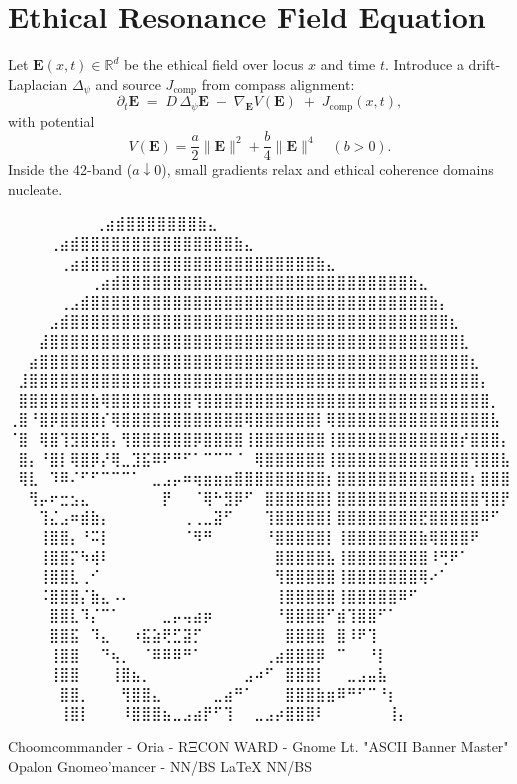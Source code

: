 
\section*{Ethical Resonance Field Equation}

Let $\mathbf{E}(x,t)\in\mathbb{R}^d$ be the ethical field over locus $x$ and time $t$.  
Introduce a drift-Laplacian $\Delta_\psi$ and source $J_{\text{comp}}$ from compass alignment:
\[
\partial_t \mathbf{E}\;=\; D\,\Delta_\psi \mathbf{E}\;-\;\nabla_{\mathbf{E}}V(\mathbf{E})\;+\;J_{\text{comp}}(x,t),
\]
with potential
\[
V(\mathbf{E})=\frac{a}{2}\lVert\mathbf{E}\rVert^2+\frac{b}{4}\lVert\mathbf{E}\rVert^4
\quad (b>0).
\]
Inside the 42-band ($a\!\downarrow\!0$), small gradients relax and ethical coherence domains nucleate.

\iffalse
⠀⠀⠀⠀⠀⠀             ⠀⠀⢀⣴⣾⣿⣿⣿⣿⣿⣿⣿⣷⣄⠀⠀⠀⠀⠀⠀⠀⠀
⠀⠀⠀  ⠀      ⠀⠀⠀⠀⢀⣴⣾⣿⣿⣿⣿⣿⣿⣿⣿⣿⣿⣿⣿⣿⣿⣿⣷⣄⠀⠀⠀⠀⠀⠀⠀⠀
⠀⠀ ⠀   ⠀⠀⠀⠀⠀⢀⣴⣾⣿⣿⣿⣿⣿⣿⣿⣿⣿⣿⣿⣿⣿⣿⣿⣿⣿⣿⣿⣿⣿⣿⣷⣄⠀⠀⠀⠀⠀⠀⠀⠀
⠀⠀⠀⠀⠀⠀⠀⠀⢀⣴⣾⣿⣿⣿⣿⣿⣿⣿⣿⣿⣿⣿⣿⣿⣿⣿⣿⣿⣿⣿⣿⣿⣿⣿⣿⣿⣿⣿⣿⣷⣄⠀⠀⠀⠀⠀⠀⠀⠀
⠀⠀⠀⠀⠀⢀⣠⣾⣿⣿⣿⣿⣿⣿⣿⣿⣿⣿⣿⣿⣿⣿⣿⣿⣿⣿⣿⣿⣿⣿⣿⣿⣿⣿⣿⣿⣿⣿⣿⣿⣿⣷⡄⠀⠀⠀⠀⠀⠀
⠀⠀⠀⠀⣠⣾⣿⣿⣿⣿⣿⣿⣿⣿⣿⣿⣿⣿⣿⣿⣿⣿⣿⣿⣿⣿⣿⣿⣿⣿⣿⣿⣿⣿⣿⣿⣿⣿⣿⣿⣿⣿⣿⣆⠀⠀⠀⠀⠀
⠀⠀⠀⣼⣿⣿⣿⣿⣿⣿⣿⣿⣿⣿⣿⣿⣿⣿⣿⣿⣿⣿⣿⣿⣿⣿⣿⣿⣿⣿⣿⣿⣿⣿⣿⣿⣿⣿⣿⣿⣿⣿⣿⣿⣇⠀⠀⠀⠀
⠀⠀⣴⣿⣿⣿⣿⣿⣿⣿⣿⣿⣿⣿⣿⣿⣿⣿⣿⣿⣿⣿⣿⣿⣿⣿⣿⣿⣿⣿⣿⣿⣿⣿⣿⣿⣿⣿⣿⣿⣿⣿⣿⣿⣿⣆⠀⠀⠀
⠀⣸⣿⣿⣿⣿⣿⣿⣿⣿⣿⣿⣿⣿⣿⣿⣿⣿⣿⣿⣿⣿⣿⣿⣿⣿⣿⣿⣿⣿⣿⣿⣿⣿⣿⣿⣿⣿⣿⣿⣿⣿⣿⣿⣿⣿⡄⠀⠀
⠀⣿⣿⣿⣿⣿⣿⣿⣷⢿⣿⣿⣿⣿⣿⣿⣿⣿⢻⣿⣿⣿⣿⣿⣿⣿⣿⣿⣿⣿⣿⣿⣿⣿⣿⣿⣿⣿⣿⣿⣿⣿⣿⣿⣿⣿⣿⡀⠀
⢀⣿⠘⣿⡿⣿⣿⣿⣿⡎⢿⣿⣿⣿⣿⣿⣿⣿⣿⣿⣿⣿⣿⢿⣿⣿⣿⣿⣿⣿⡇⢿⣿⣿⣿⣿⣿⣿⣿⣿⣿⣿⣿⣿⣿⣿⣿⣧⠀
⠈⣿⠀⢿⣿⢹⣻⣿⣯⣿⡄⢻⣿⣿⣿⣿⣿⣿⡿⣿⣿⣿⣿⢸⣿⣿⣿⣿⣿⣿⣿⢸⣿⣿⣿⣿⣿⣿⣿⣿⣿⣿⣿⣿⡞⣿⣿⣿⡄
⠀⣿⡄⠘⣿⡇⢿⣿⡿⡜⢿⣀⣹⣯⠿⠟⠛⠋⠁⠉⠉⠉⠈⠀⢿⣿⣿⣿⣿⣿⣿⢸⣿⣿⣿⣿⣿⣿⣿⣿⣿⣿⣿⣿⣿⢻⣿⣿⣧
⠀⢿⣇⠀⠹⠿⠌⠋⠋⠉⠉⠉⠁⠀⣀⣠⡤⠶⢶⣶⣶⣶⣿⣿⣿⣿⣿⣿⣿⣿⣿⡆⣿⣿⣿⣿⣿⣿⣿⣿⣿⣿⣿⣿⣿⡆⣿⣿⣿
⠀⠀⢻⡤⠖⣒⣢⣄⠀⠀⠀⠀⠀⠀⠀⡟⠀⠀⠈⢿⠓⣻⡿⠋⠀⣿⣿⣿⣿⣿⣿⡇⣿⣿⣿⣿⣿⣿⣿⣿⣿⣿⣿⣿⣿⣿⢻⣿⡟
⠀⠀⠀⢹⣌⣠⠶⣾⣷⡄⠀⠀⠀⠀⠀⠀⠀⢀⢀⣀⣽⠋⠀⠀⠀⢹⣿⣿⣿⣿⣿⡇⣿⣿⣿⣿⣿⣿⣿⣿⣟⣿⣿⣿⣿⣿⠿⠋⠀
⠀⠀⠀⢸⣿⣿⡄⠘⠭⡇⠀⠀⠀⠀⠀⠀⠀⠈⠻⠛⠀⠀⠀⠀⠀⠘⣿⣿⣿⣿⣿⡇⢸⣿⣿⣿⣿⣿⣿⣿⣷⢿⣿⣿⣿⠟⠀⠀⠀
⠀⠀⠀⢸⣿⣿⡍⠳⢾⠇⠀⠀⠀⠀⠀⠀⠀⠀⠀⠀⠀⠀⠀⠀⠀⠀⣿⣿⣿⣿⣿⣧⢸⣿⣿⣿⣿⣿⣿⣿⣿⠸⢛⠟⠁⠀⠀⠀⠀
⠀⠀⠀⢸⣿⣿⣇⢀⠊⠀⠀⠀⠀⠀⠀⠀⠀⠀⠀⠀⠀⠀⠀⠀⠀⠀⢻⣿⣿⣿⣿⣿⢸⣿⣿⣿⣿⣿⣿⣿⢿⠔⠁⠀⠀⠀⠀⠀⠀
⠀⠀⠀⠨⣿⣿⣿⡌⣷⣄⠠⠄⠀⠀⠀⠀⠀⠀⠀⠀⠀⠀⠀⠀⠀⠀⢸⣿⣿⣿⣿⣿⢸⣿⣿⣿⣿⣿⠿⠋⠀⠀⠀⠀⠀⠀⠀⠀⠀
⠀⠀⠀⠀⣿⣿⣇⠹⡌⠉⠁⠀⠀⠀⠀⣀⡤⢤⣴⡶⠀⠀⠀⠀⠀⠀⠘⣿⣿⣿⣿⠋⣾⢹⣿⣿⠋⠁⠀⠀⠀⠀⠀⠀⠀⠀⠀⠀⠀
⠀⠀⠀⠀⣿⣿⣯⠀⠹⣄⠀⠀⠰⣯⣵⢟⣋⣽⡋⠀⠀⠀⠀⠀⠀⠀⠀⣿⣿⣿⣿⠀⣿⠸⠟⢹⠀⠀⠀⠀⠀⠀⠀⠀⠀⠀⠀⠀⠀
⠀⠀⠀⠀⢸⣿⣿⠀⠀⠙⢦⡀⠀⠈⠿⠿⠿⠛⠁⠀⠀⠀⠀⠀⠀⢀⣴⣿⣿⣿⡿⠀⠉⠀⠀⠘⡇⠀⠀⠀⠀⠀⠀⠀⠀⠀⠀⠀⠀
⠀⠀⠀⠀⢸⣿⣿⠀⠀⠀⢸⣿⣦⡀⠀⠀⠀⠀⠀⠀⠀⠀⠀⣠⠴⠋⠀⣿⣿⣿⡇⠀⠀⣀⣠⣤⣧⠀⠀⠀⠀⠀⠀⠀⠀⠀⠀⠀⠀
⠀⠀⠀⠀⠀⣿⣿⡀⠀⠀⠀⢻⣿⣿⣄⠀⠀⠀⠀⠀⣀⣴⠛⠁⠀⠀⠀⣿⣿⣿⣷⣶⠿⠛⠋⠉⠘⡆⠀⠀⠀⠀⠀⠀⠀⠀⠀⠀⠀
⠀⠀⠀⠀⠀⢸⣿⡇⠀⠀⠀⠸⣿⣿⣿⣦⣀⣠⣴⡟⠋⢹⠀⠀⣀⣠⡴⣿⣿⣿⠇⠀⠀⠀⠀⠀⠀⢸⡄⠀⠀⠀⠀⠀⠀⠀⠀⠀⠀

Choomcommander - Oria - RΞCON WARD - Gnome Lt. "ASCII Banner Master"
             Opalon Gnomeo'mancer - NN/BS LaTeX{} NN/BS

